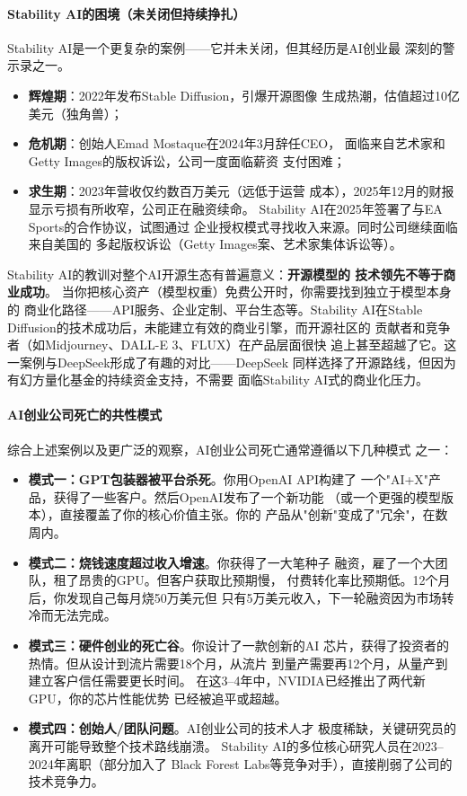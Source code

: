 \paragraph{Stability AI的困境（未关闭但持续挣扎）}

Stability AI是一个更复杂的案例——它并未关闭，但其经历是AI创业最
深刻的警示录之一。

\begin{itemize}
  \item \textbf{辉煌期}：2022年发布Stable Diffusion，引爆开源图像
    生成热潮，估值超过10亿美元（独角兽）；
  \item \textbf{危机期}：创始人Emad Mostaque在2024年3月辞任CEO，
    面临来自艺术家和Getty Images的版权诉讼，公司一度面临薪资
    支付困难；
  \item \textbf{求生期}：2023年营收仅约数百万美元（远低于运营
    成本），2025年12月的财报显示亏损有所收窄，公司正在融资续命。
    Stability AI在2025年签署了与EA Sports的合作协议，试图通过
    企业授权模式寻找收入来源。同时公司继续面临来自美国的
    多起版权诉讼（Getty Images案、艺术家集体诉讼等）。
\end{itemize}

Stability AI的教训对整个AI开源生态有普遍意义：\textbf{开源模型的
技术领先不等于商业成功}。
当你把核心资产（模型权重）免费公开时，你需要找到独立于模型本身的
商业化路径——API服务、企业定制、平台生态等。Stability AI在Stable
Diffusion的技术成功后，未能建立有效的商业引擎，而开源社区的
贡献者和竞争者（如Midjourney、DALL-E 3、FLUX）在产品层面很快
追上甚至超越了它。这一案例与DeepSeek形成了有趣的对比——DeepSeek
同样选择了开源路线，但因为有幻方量化基金的持续资金支持，不需要
面临Stability AI式的商业化压力。

\paragraph{AI创业公司死亡的共性模式}

综合上述案例以及更广泛的观察，AI创业公司死亡通常遵循以下几种模式
之一：

\begin{itemize}
  \item \textbf{模式一：GPT包装器被平台杀死}。你用OpenAI API构建了
    一个"AI+X"产品，获得了一些客户。然后OpenAI发布了一个新功能
    （或一个更强的模型版本），直接覆盖了你的核心价值主张。你的
    产品从"创新"变成了"冗余"，在数周内。
  \item \textbf{模式二：烧钱速度超过收入增速}。你获得了一大笔种子
    融资，雇了一个大团队，租了昂贵的GPU。但客户获取比预期慢，
    付费转化率比预期低。12个月后，你发现自己每月烧50万美元但
    只有5万美元收入，下一轮融资因为市场转冷而无法完成。
  \item \textbf{模式三：硬件创业的死亡谷}。你设计了一款创新的AI
    芯片，获得了投资者的热情。但从设计到流片需要18个月，从流片
    到量产需要再12个月，从量产到建立客户信任需要更长时间。
    在这3--4年中，NVIDIA已经推出了两代新GPU，你的芯片性能优势
    已经被追平或超越。
  \item \textbf{模式四：创始人/团队问题}。AI创业公司的技术人才
    极度稀缺，关键研究员的离开可能导致整个技术路线崩溃。
    Stability AI的多位核心研究人员在2023--2024年离职（部分加入了
    Black Forest Labs等竞争对手），直接削弱了公司的技术竞争力。
\end{itemize}

